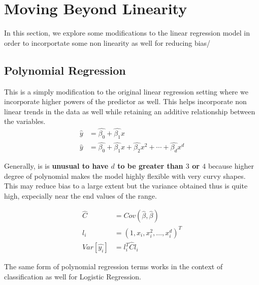 \documentclass[../statistical_learning_notes.tex]{subfiles}
\begin{document}
    \chapter{Moving Beyond Linearity}
    In this section, we explore some modifications to the linear regression model in order to incorportate some non linearity as well for reducing bias/

    \section{Polynomial Regression}
    This is a simply modification to the original linear regression setting where we incorporate higher powers of the predictor as well. This helps incorporate non linear trends in the data as well while retaining an additive relationship between the variables.
    \begin{align*}
        \hat{y} &= \hat{\beta_{0}} + \hat{\beta_{1}}x \tag*{Linear Regression}\\
        \hat{y} &= \hat{\beta_{0}} + \hat{\beta_{1}}x + \hat{\beta_{2}}x^{2} + \cdots + \hat{\beta_{d}}x^{d} \tag*{Polynomial Regression}
    \end{align*}

    Generally, is is \textbf{unusual to have $d$ to be greater than $3$ or $4$} because higher degree of polynomial makes the model highly flexible with very curvy shapes. This may reduce bias to a large extent but the variance obtained thus is quite high, expecially near the end values of the range.

    \begin{align*}
        \hat{C} &= Cov(\hat{\beta}, \hat{\beta})\\
        l_{i} &= (1, x_{i}, x_{i}^{2}, \ldots, x_{i}^{d})^{T}\\
        Var[\hat{y_{i}}] &= l_{i}^{T}\hat{C}l_{i}
    \end{align*}

    The same form of polynomial regression terms works in the context of classification as well for Logistic Regression.

    
\end{document}
